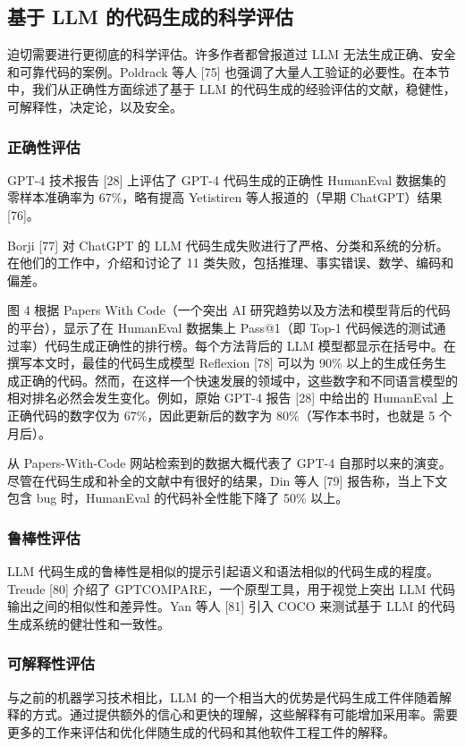 \begin{translation}
\subsection{基于 LLM 的代码生成的科学评估}

迫切需要进行更彻底的科学评估。许多作者都曾报道过 LLM 无法生成正确、安全和可靠代码的案例。Poldrack 等人 [75] 也强调了大量人工验证的必要性。在本节中，我们从正确性方面综述了基于 LLM 的代码生成的经验评估的文献，稳健性，可解释性，决定论，以及安全。

\subsubsection{正确性评估} GPT-4 技术报告 [28] 上评估了 GPT-4 代码生成的正确性 HumanEval 数据集的零样本准确率为 67\%，略有提高 Yetistiren 等人报道的（早期 ChatGPT）结果 [76]。

Borji [77] 对 ChatGPT 的 LLM 代码生成失败进行了严格、分类和系统的分析。在他们的工作中，介绍和讨论了 11 类失败，包括推理、事实错误、数学、编码和偏差。

图 4 根据 Papers With Code（一个突出 AI 研究趋势以及方法和模型背后的代码的平台），显示了在 HumanEval 数据集上 Pass@1（即 Top-1 代码候选的测试通过率）代码生成正确性的排行榜。每个方法背后的 LLM 模型都显示在括号中。在撰写本文时，最佳的代码生成模型 Reflexion [78] 可以为 90\% 以上的生成任务生成正确的代码。然而，在这样一个快速发展的领域中，这些数字和不同语言模型的相对排名必然会发生变化。例如，原始 GPT-4 报告 [28] 中给出的 HumanEval 上正确代码的数字仅为 67\%，因此更新后的数字为 80\%（写作本书时，也就是 5 个月后）。

从 Papers-With-Code 网站检索到的数据大概代表了 GPT-4 自那时以来的演变。尽管在代码生成和补全的文献中有很好的结果，Din 等人 [79] 报告称，当上下文包含 bug 时，HumanEval 的代码补全性能下降了 50\% 以上。

\subsubsection{鲁棒性评估} LLM 代码生成的鲁棒性是相似的提示引起语义和语法相似的代码生成的程度。Treude [80] 介绍了 GPTCOMPARE，一个原型工具，用于视觉上突出 LLM 代码输出之间的相似性和差异性。Yan 等人 [81] 引入 COCO 来测试基于 LLM 的代码生成系统的健壮性和一致性。

\subsubsection{可解释性评估} 与之前的机器学习技术相比，LLM 的一个相当大的优势是代码生成工件伴随着解释的方式。通过提供额外的信心和更快的理解，这些解释有可能增加采用率。需要更多的工作来评估和优化伴随生成的代码和其他软件工程工件的解释。


\end{translation}
